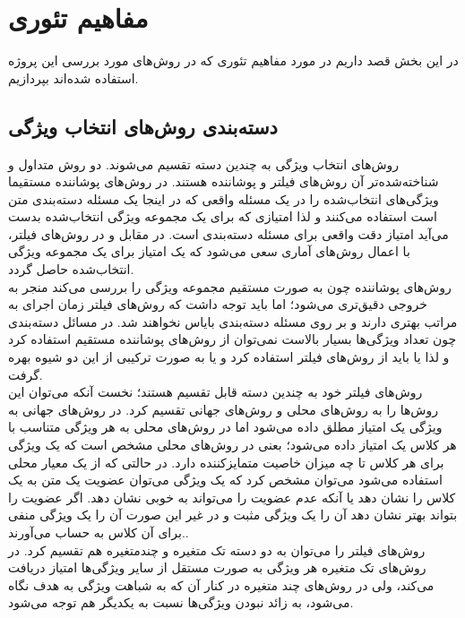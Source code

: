 \chapter{مفاهیم تئوری}
در این بخش قصد داریم در مورد مفاهیم تئوری که در روش‌های مورد بررسی این پروژه استفاده شده‌اند بپردازیم.


\section{دسته‌بندی روش‌های انتخاب ویژگی}
روش‌های انتخاب ویژگی به چندین دسته تقسیم می‌شوند. دو روش متداول و شناخته‌شده‌تر آن روش‌های فیلتر و پوشاننده هستند. در روش‌های پوشاننده مستقیما ویژگی‌های انتخاب‌شده را در یک مسئله واقعی که در اینجا یک مسئله دسته‌بندی متن است استفاده می‌کنند و لذا امتیازی که برای یک مجموعه ویژگی انتخاب‌شده بدست می‌آید امتیاز دقت واقعی برای مسئله دسته‌بندی است. در مقابل و در روش‌های فیلتر،‌ با اعمال روش‌های آماری سعی می‌شود که یک امتیاز برای یک مجموعه ویژگی انتخاب‌شده حاصل گردد.
\\

روش‌های پوشاننده چون به صورت مستقیم مجموعه ویژگی را بررسی می‌کند منجر به خروجی دقیق‌تری می‌شود؛ اما باید توجه داشت که روش‌های فیلتر زمان اجرای به مراتب بهتری دارند و بر روی مسئله دسته‌بندی بایاس نخواهند شد\cite{labani2018novel}. در مسائل دسته‌بندی چون تعداد ویژگی‌ها بسیار بالاست نمی‌توان از روش‌های پوشاننده مستقیم استفاده کرد و لذا یا باید از روش‌های فیلتر استفاده کرد و یا به صورت ترکیبی از این دو شیوه بهره گرفت.
\\

روش‌های فیلتر خود به چندین دسته قابل تقسیم هستند؛ نخست آنکه می‌توان این روش‌ها را به روش‌های محلی و روش‌های جهانی تقسیم کرد. در روش‌های جهانی به ویژگی یک امتیاز مطلق داده می‌شود اما در روش‌های محلی به هر ویژگی متناسب با هر کلاس یک امتیاز داده می‌شود؛ بعنی در روش‌های محلی مشخص است که یک ویژگی برای هر کلاس تا چه میزان خاصیت متمایزکننده دارد. در حالتی که از یک معیار محلی استفاده می‌شود می‌توان مشخص کرد که یک ویژگی می‌توان عضویت یک متن به یک کلاس را نشان دهد یا آنکه عدم عضویت را می‌تواند به خوبی نشان دهد. اگر عضویت را بتواند بهتر نشان دهد آن را یک ویژگی مثبت و در غیر این صورت آن را یک ویژگی منفی برای آن کلاس به حساب می‌آورند.\cite{uysal2016improved}.
\\

روش‌های فیلتر را می‌توان به دو دسته تک متغیره و چندمتغیره  هم تقسیم کرد. در روش‌های تک متغیره هر ویژگی به صورت مستقل از سایر ویژگی‌ها امتیاز دریافت می‌کند، ولی در روش‌های چند متغیره در کنار آن که به شباهت ویژگی به هدف نگاه می‌شود، به زائد نبودن ویژگی‌ها نسبت به یکدیگر هم توجه می‌شود.\cite{labani2018novel}

